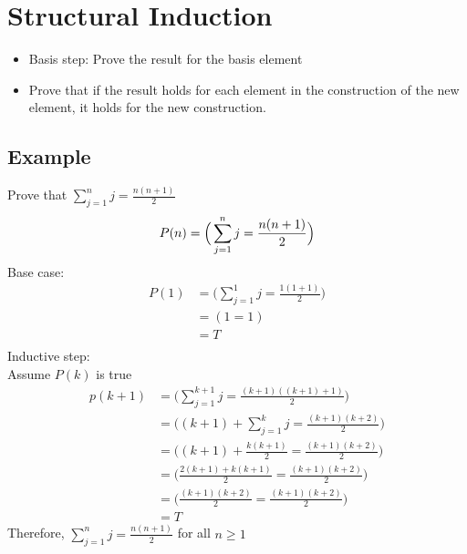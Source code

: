 \documentclass{article}
\theoremstyle{mytheoremstyle}
\theoremstyle{mytheoremstyle}
\theoremstyle{myproblemstyle}
\begin{document}
    \section*{Structural Induction}
    \begin{itemize}
        \item Basis step: Prove the result for the basis element
        \item Prove that if the result holds for each element in the
            construction of the new element, it holds for the new construction.
    \end{itemize}


    \subsection*{Example}
    Prove that $\sum_{j=1}^{n} j = \frac{n(n+1)}{2}$
    \[
        P(n) = \Big(\sum_{j=1}^{n} j = \frac{n(n+1)}{2}\Big) \\
    \]
    Base case:
    \begin{align*}
        P(1) &= \Big(\sum_{j=1}^{1} j = \frac{1(1+1)}{2}\Big) \\
             &= (1=1) \\
             &= T \\
    \end{align*}
    Inductive step: \\
    Assume $P(k)$ is true
    \begin{align*}
        p(k+1) &= \Big(\sum_{j=1}^{k+1} j = \frac{(k+1)((k+1)+1)}{2}\Big) \\
               &= \Big((k+1) + \sum_{j=1}^{k} j = \frac{(k+1)(k+2)}{2}\Big) \\
               &= \Big((k+1) + \frac{k(k+1)}{2} = \frac{(k+1)(k+2)}{2}\Big) \\
               &= \Big(\frac{2(k+1) + k(k+1)}{2} = \frac{(k+1)(k+2)}{2}\Big) \\
               &= \Big(\frac{(k+1)(k+2)}{2} = \frac{(k+1)(k+2)}{2}\Big) \\
               &= T
    \end{align*}
    Therefore, $\sum_{j=1}^{n} j = \frac{n(n+1)}{2}$ for all $n\ge 1$
\end{document}

